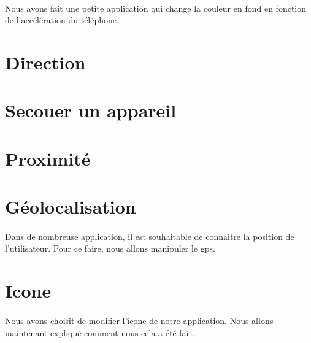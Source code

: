 \documentclass[a4paper]{article}
\begin{document}
\begin{multicols}{2}
            \paragraph{}
                Nous avons fait une petite application qui change la couleur en fond en fonction de l'accélération du téléphone.
        \section{Direction}
        \section{Secouer un appareil}
        \section{Proximité}
        \section{Géolocalisation}
            \paragraph{}
                Dans de nombreuse application, il est souhaitable de connaitre la position de l'utilisateur. Pour ce faire, nous allons manipuler le gps.
        \section{Icone}
            \paragraph{}
                Nous avons choisit de modifier l'îcone de notre application. Nous allons maintenant expliqué comment nous cela a été fait.
    \end{multicols}
\end{document}
